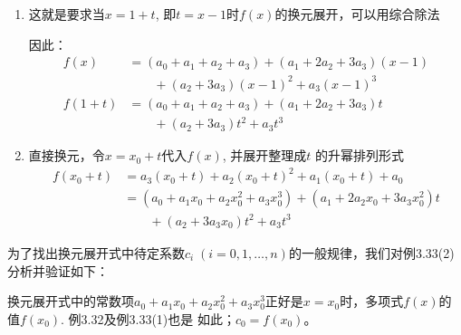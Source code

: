 \begin{solution}
\begin{enumerate}
    \item 
这就是要求当$x=1+t$, 即$t=x-1$时$f(x)$的换元展开，可以用综合除法
\begin{center}
\end{center}
因此：
\[\begin{split}
    f (x) &= (a_0+a_1 +a_2 +a_3) + (a_1 +2a_2+3a_3 ) (x-1)\\
    &\qquad +(a_2 +3a_3) (x-1)^2+a_3(x-1)^3\\
f(1+t)&=(a_0+a_1 +a_2 +a_3) +(a_1 +2a_2+3a_3)t \\
&\qquad + (a_2+3a_3) t^2+a_3t^3
\end{split}\]

\item 直接换元，令$x=x_0+t$代入$f(x)$, 并展开整理成$t$
的升幂排列形式
\[\begin{split}
    f (x_0+t) &=a_3(x_0+t) +a_2(x_0+t)^2+a_1(x_0+t)+a_0\\
&=(a_0 +a_1x_0 +a_2x_0^2+a_3x_0^3) + (a_1+2a_2x_0+3a_3 x^2_0)t\\
&\qquad + (a_2+3a_3x_0) t^2+a_3t^3
\end{split} \]
\end{enumerate}
\end{solution}

为了找出换元展开式中待定系数$c_i\; (i=0, 1,\ldots,n)$的一般规律，我们对例3.33(2)分析并验证如下：

换元展开式中的常数项$a_0+a_1x_0+a_2x_0^2+a_3x_0^3$正好是$x=x_0$时，多项式$f(x)$的值$f(x_0)$. 例3.32及例3.33(1)也是 如此；$c_0=f (x_0)$。

